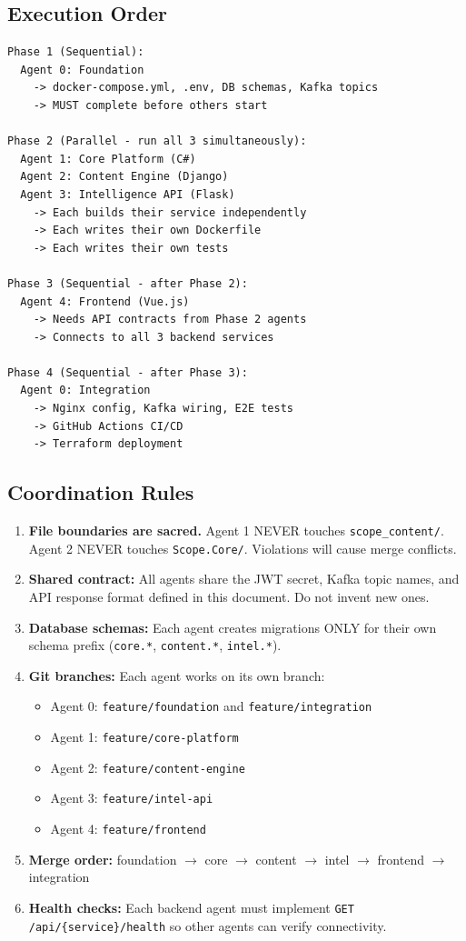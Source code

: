 \documentclass[12pt,letterpaper]{article}
\begin{document}
\subsection{Execution Order}

\begin{lstlisting}[style=code]
Phase 1 (Sequential):
  Agent 0: Foundation
    -> docker-compose.yml, .env, DB schemas, Kafka topics
    -> MUST complete before others start

Phase 2 (Parallel - run all 3 simultaneously):
  Agent 1: Core Platform (C#)
  Agent 2: Content Engine (Django)
  Agent 3: Intelligence API (Flask)
    -> Each builds their service independently
    -> Each writes their own Dockerfile
    -> Each writes their own tests

Phase 3 (Sequential - after Phase 2):
  Agent 4: Frontend (Vue.js)
    -> Needs API contracts from Phase 2 agents
    -> Connects to all 3 backend services

Phase 4 (Sequential - after Phase 3):
  Agent 0: Integration
    -> Nginx config, Kafka wiring, E2E tests
    -> GitHub Actions CI/CD
    -> Terraform deployment
\end{lstlisting}

\subsection{Coordination Rules}
\begin{enumerate}
  \item \textbf{File boundaries are sacred.} Agent 1 NEVER touches \texttt{scope\_content/}. Agent 2 NEVER touches \texttt{Scope.Core/}. Violations will cause merge conflicts.
  \item \textbf{Shared contract:} All agents share the JWT secret, Kafka topic names, and API response format defined in this document. Do not invent new ones.
  \item \textbf{Database schemas:} Each agent creates migrations ONLY for their own schema prefix (\texttt{core.*}, \texttt{content.*}, \texttt{intel.*}).
  \item \textbf{Git branches:} Each agent works on its own branch:
  \begin{itemize}
    \item Agent 0: \texttt{feature/foundation} and \texttt{feature/integration}
    \item Agent 1: \texttt{feature/core-platform}
    \item Agent 2: \texttt{feature/content-engine}
    \item Agent 3: \texttt{feature/intel-api}
    \item Agent 4: \texttt{feature/frontend}
  \end{itemize}
  \item \textbf{Merge order:} foundation $\rightarrow$ core $\rightarrow$ content $\rightarrow$ intel $\rightarrow$ frontend $\rightarrow$ integration
  \item \textbf{Health checks:} Each backend agent must implement \texttt{GET /api/\{service\}/health} so other agents can verify connectivity.
\end{enumerate}
\end{document}
